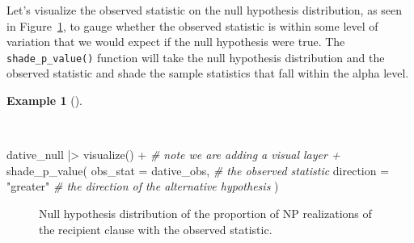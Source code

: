 \documentclass[
  letterpaper,
]{latex/krantz}
\newenvironment{Shaded}{\begin{snugshade}}{\end{snugshade}}
\newcommand{\AttributeTok}[1]{\textcolor[rgb]{0.00,0.00,0.00}{#1}}
\newcommand{\CommentTok}[1]{\textcolor[rgb]{0.00,0.00,0.00}{\textit{#1}}}
\newcommand{\FunctionTok}[1]{\textcolor[rgb]{0.00,0.00,0.00}{#1}}
\newcommand{\NormalTok}[1]{\textcolor[rgb]{0.00,0.00,0.00}{#1}}
\newcommand{\SpecialCharTok}[1]{\textcolor[rgb]{0.00,0.00,0.00}{#1}}
\newcommand{\StringTok}[1]{\textcolor[rgb]{0.00,0.00,0.00}{#1}}
\theoremstyle{definition}
\newtheorem{example}{Example}[chapter]
\theoremstyle{remark}
\begin{document}
Let's visualize the observed statistic on the null hypothesis
distribution, as seen in Figure~\ref{fig-ida-cat-null-hypothesis-obs},
to gauge whether the observed statistic is within some level of
variation that we would expect if the null hypothesis were true. The
\texttt{shade\_p\_value()} function will take the null hypothesis
distribution and the observed statistic and shade the sample statistics
that fall within the alpha level.

\begin{example}[]\protect\hypertarget{exm-ida-cat-null-hypothesis-obs}{}\label{exm-ida-cat-null-hypothesis-obs}

~

\begin{Shaded}
\begin{Highlighting}[]
\NormalTok{dative\_null }\SpecialCharTok{|\textgreater{}}
  \FunctionTok{visualize}\NormalTok{() }\SpecialCharTok{+} \CommentTok{\# note we are adding a visual layer \textasciigrave{}+\textasciigrave{}}
  \FunctionTok{shade\_p\_value}\NormalTok{(}
    \AttributeTok{obs\_stat =}\NormalTok{ dative\_obs, }\CommentTok{\# the observed statistic}
    \AttributeTok{direction =} \StringTok{"greater"} \CommentTok{\# the direction of the alternative hypothesis}
\NormalTok{  )}
\end{Highlighting}
\end{Shaded}

\begin{figure}[H]


\caption{\label{fig-ida-cat-null-hypothesis-obs}Null hypothesis
distribution of the proportion of NP realizations of the recipient
clause with the observed statistic.}

\end{figure}%

\end{example}
\end{document}
